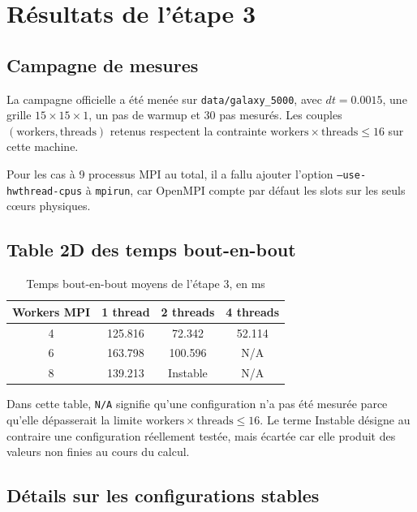 \section{Résultats de l'étape 3}

\subsection{Campagne de mesures}

La campagne officielle a été menée sur \texttt{data/galaxy\_5000}, avec \(dt = 0.0015\), une grille \(15 \times 15 \times 1\), un pas de warmup et 30 pas mesurés. Les couples \((\text{workers}, \text{threads})\) retenus respectent la contrainte \(\text{workers} \times \text{threads} \leq 16\) sur cette machine.

Pour les cas à 9 processus MPI au total, il a fallu ajouter l'option \texttt{--use-hwthread-cpus} à \texttt{mpirun}, car OpenMPI compte par défaut les slots sur les seuls cœurs physiques.

\subsection{Table 2D des temps bout-en-bout}

\begin{table}[H]
    \centering
    \begin{tabular}{c c c c}
        \toprule
        \textbf{Workers MPI} & \textbf{1 thread} & \textbf{2 threads} & \textbf{4 threads} \\
        \midrule
        4 & 125.816 & 72.342 & 52.114 \\
        6 & 163.798 & 100.596 & N/A \\
        8 & 139.213 & Instable & N/A \\
        \bottomrule
    \end{tabular}
    \caption{Temps bout-en-bout moyens de l'étape 3, en ms}
    \label{tab:stage3_matrix}
\end{table}

Dans cette table, \texttt{N/A} signifie qu'une configuration n'a pas été mesurée parce qu'elle dépasserait la limite \(\text{workers} \times \text{threads} \leq 16\). Le terme \og Instable \fg{} désigne au contraire une configuration réellement testée, mais écartée car elle produit des valeurs non finies au cours du calcul.

\subsection{Détails sur les configurations stables}

